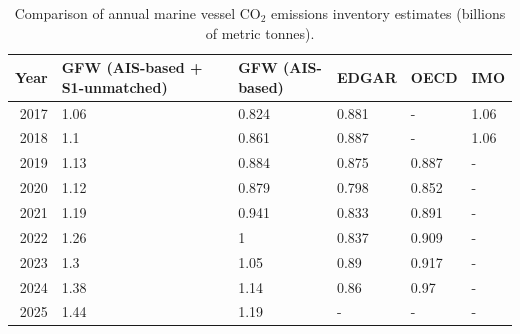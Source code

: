 \begin{table}[!h]
\centering
\caption{\label{tab:inventory_comparison}Comparison of annual marine vessel CO$_{2}$ emissions inventory estimates (billions of metric tonnes).}
\centering
\fontsize{8}{10}\selectfont
\begin{tabular}[t]{r|l|l|l|l|l}
\hline
Year & GFW (AIS-based + S1-unmatched) & GFW (AIS-based) & EDGAR & OECD & IMO\\
\hline
2017 & 1.06 & 0.824 & 0.881 & - & 1.06\\
\hline
2018 & 1.1 & 0.861 & 0.887 & - & 1.06\\
\hline
2019 & 1.13 & 0.884 & 0.875 & 0.887 & -\\
\hline
2020 & 1.12 & 0.879 & 0.798 & 0.852 & -\\
\hline
2021 & 1.19 & 0.941 & 0.833 & 0.891 & -\\
\hline
2022 & 1.26 & 1 & 0.837 & 0.909 & -\\
\hline
2023 & 1.3 & 1.05 & 0.89 & 0.917 & -\\
\hline
2024 & 1.38 & 1.14 & 0.86 & 0.97 & -\\
\hline
2025 & 1.44 & 1.19 & - & - & -\\
\hline
\end{tabular}
\end{table}
